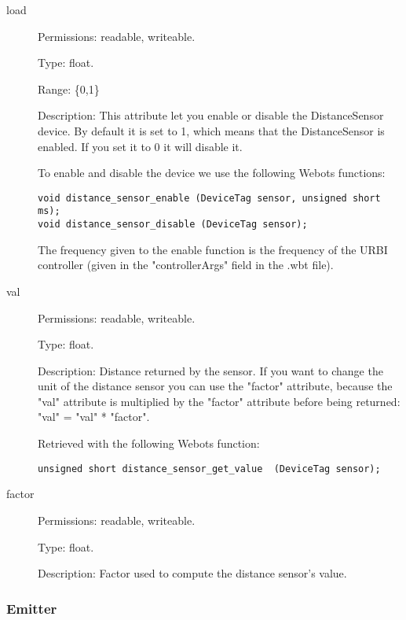 \noindent
\begin{description}
\item[{load}]     Permissions: readable, writeable.


  Type: float.


  Range: \{0,1\}


  Description: This attribute let you enable or disable the
  DistanceSensor device.  By default it is set to 1, which means that
  the DistanceSensor is enabled. If you set it to 0 it will disable
  it.


  To enable and disable the device we use the following Webots
  functions:


\begin{lstlisting}[firstnumber=1,]
void distance_sensor_enable (DeviceTag sensor, unsigned short ms);
void distance_sensor_disable (DeviceTag sensor);
\end{lstlisting}

The frequency given to the enable function is the frequency of the
URBI controller (given in the "controllerArgs" field in the .wbt
file).

\item[{         val
 }]            Permissions: readable, writeable.


 Type: float.


 Description: Distance returned by the sensor. If you want to change
 the unit of the distance sensor you can use the "factor" attribute,
 because the "val" attribute is multiplied by the "factor" attribute
 before being returned: "val" = "val" * "factor".


 Retrieved with the following Webots function:


\begin{lstlisting}[firstnumber=1,]
unsigned short distance_sensor_get_value  (DeviceTag sensor);
\end{lstlisting}
\item[{factor}] Permissions: readable, writeable.


  Type: float.


  Description: Factor used to compute the distance sensor's value.

\end{description}

\subsubsection{Emitter}
\label{webots.uobjects.robotdevices.emitter}%

